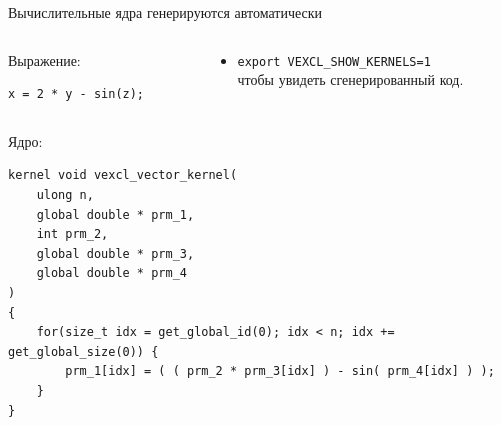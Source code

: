 \documentclass[@BEAMER_OPTIONS@]{beamer}
\newcommand{\code}[1]{\lstinline|#1|}
\begin{document}
\begin{frame}[fragile]{Вычислительные ядра генерируются автоматически}
    \begin{columns}
        \begin{column}{0.38\textwidth}
            \begin{exampleblock}{Выражение:}
                \begin{lstlisting}
x = 2 * y - sin(z);
                \end{lstlisting}
            \end{exampleblock}
        \end{column}
        \begin{column}{0.55\textwidth}
            \begin{itemize}
                \item \code{export VEXCL_SHOW_KERNELS=1}\\
                    чтобы увидеть сгенерированный код.
            \end{itemize}
        \end{column}
    \end{columns}
    \begin{exampleblock}{Ядро:}
        \begin{lstlisting}
kernel void vexcl_vector_kernel(
    ulong n,
    global double * prm_1,
    int prm_2,
    global double * prm_3,
    global double * prm_4
)
{
    for(size_t idx = get_global_id(0); idx < n; idx += get_global_size(0)) {
        prm_1[idx] = ( ( prm_2 * prm_3[idx] ) - sin( prm_4[idx] ) );
    }
}
        \end{lstlisting}
    \end{exampleblock}
\end{frame}
\end{document}
